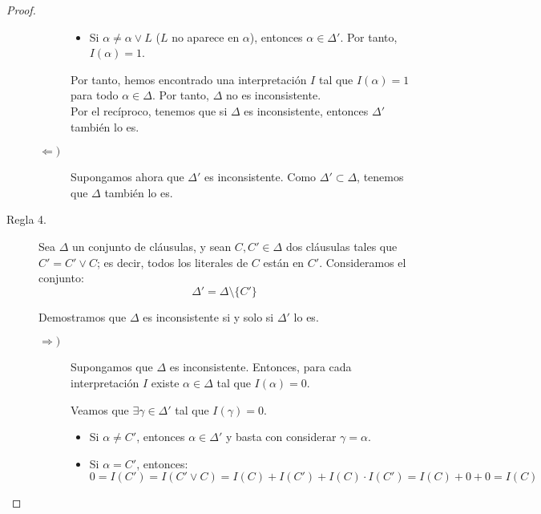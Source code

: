 \begin{teo}
\begin{proof}
\begin{description}
\begin{description}
\begin{itemize}
                        \item Si $\alpha\neq \alpha\lor L$ ($L$ no aparece en $\alpha$), entonces $\alpha\in \Delta'$. Por tanto, $I(\alpha)=1$.
                    \end{itemize}

                    Por tanto, hemos encontrado una interpretación $I$ tal que $I(\alpha)=1$ para todo $\alpha\in \Delta$. Por tanto, $\Delta$ no es inconsistente.\\

                    Por el recíproco, tenemos que si $\Delta$ es inconsistente, entonces $\Delta'$ también lo es.

                    \item[$\Longleftarrow)$] Supongamos ahora que $\Delta'$ es inconsistente. Como $\Delta'\subset \Delta$, tenemos que $\Delta$ también lo es.
                \end{description}

                \item[Regla 4.] Sea $\Delta$ un conjunto de cláusulas, y sean $C,C'\in \Delta$ dos cláusulas tales que $C'=C'\lor C$; es decir, todos los literales de $C$ están en $C'$.
                Consideramos el conjunto:
                \begin{equation*}
                    \Delta'=\Delta\setminus \{C'\}
                \end{equation*}
                
                Demostramos que $\Delta$ es inconsistente si y solo si $\Delta'$ lo es.
                \begin{description}
                    \item[$\Longrightarrow)$] Supongamos que $\Delta$ es inconsistente. Entonces, para cada interpretación $I$ existe $\alpha\in \Delta$ tal que $I(\alpha)=0$.
                    
                    Veamos que $\exists \gamma\in \Delta'$ tal que $I(\gamma)=0$.
                    \begin{itemize}
                        \item Si $\alpha\neq C'$, entonces $\alpha\in \Delta'$ y basta con considerar $\gamma=\alpha$.
                        
                        \item Si $\alpha=C'$, entonces:
                        \begin{equation*}
                            0=I(C')=I(C'\lor C)=I(C)+I(C')+I(C)\cdot I(C')=I(C)+0+0=I(C)
                        \end{equation*}


\end{itemize}
\end{description}
\end{description}
\end{proof}
\end{teo}

